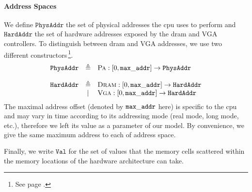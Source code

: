 \paragraph{Address Spaces}
%
We define $\texttt{PhysAddr}$ the set of physical addresses the \ac{cpu} uses to
perform \IO and $\texttt{HardAddr}$ the set of hardware addresses exposed by the
\ac{dram} and VGA controllers.
%
To distinguish between \ac{dram} and VGA addresses, we use two different
constructors\,\footnote{See page \pageref{frontmatter:notations}.}.
%
\[
  \begin{array}{rcl}
    \texttt{PhysAddr}
    & \triangleq
    & \textsc{Pa} : [0, \val{max\_addr}] \rightarrow
      \texttt{PhysAddr} \\
    & %
    & \\ %
    \texttt{HardAddr}
    & \triangleq
    & \textsc{Dram} : [0, \val{max\_addr}] \rightarrow
      \texttt{HardAddr} \\
    & |
    & \textsc{Vga} : [0, \val{max\_addr}] \rightarrow
      \texttt{HardAddr}
  \end{array}
\]
%
The maximal address offset (denoted by $\mathtt{max\_addr}$ here) is specific to
the \ac{cpu} and may vary in time according to its addressing mode (real mode,
long mode, etc.), therefore we left its value as a parameter of our model.
%
By convenience, we give the same maximum address to each of address space.

Finally, we write $\texttt{Val}$ for the set of values that the memory cells
scattered within the memory locations of the hardware architecture can take.

